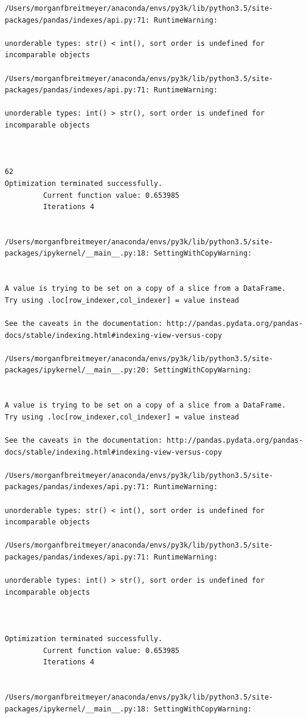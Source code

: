 \begin{lstlisting}
/Users/morganfbreitmeyer/anaconda/envs/py3k/lib/python3.5/site-packages/pandas/indexes/api.py:71: RuntimeWarning:

unorderable types: str() < int(), sort order is undefined for incomparable objects

/Users/morganfbreitmeyer/anaconda/envs/py3k/lib/python3.5/site-packages/pandas/indexes/api.py:71: RuntimeWarning:

unorderable types: int() > str(), sort order is undefined for incomparable objects



62
Optimization terminated successfully.
         Current function value: 0.653985
         Iterations 4


/Users/morganfbreitmeyer/anaconda/envs/py3k/lib/python3.5/site-packages/ipykernel/__main__.py:18: SettingWithCopyWarning:


A value is trying to be set on a copy of a slice from a DataFrame.
Try using .loc[row_indexer,col_indexer] = value instead

See the caveats in the documentation: http://pandas.pydata.org/pandas-docs/stable/indexing.html#indexing-view-versus-copy

/Users/morganfbreitmeyer/anaconda/envs/py3k/lib/python3.5/site-packages/ipykernel/__main__.py:20: SettingWithCopyWarning:


A value is trying to be set on a copy of a slice from a DataFrame.
Try using .loc[row_indexer,col_indexer] = value instead

See the caveats in the documentation: http://pandas.pydata.org/pandas-docs/stable/indexing.html#indexing-view-versus-copy

/Users/morganfbreitmeyer/anaconda/envs/py3k/lib/python3.5/site-packages/pandas/indexes/api.py:71: RuntimeWarning:

unorderable types: str() < int(), sort order is undefined for incomparable objects

/Users/morganfbreitmeyer/anaconda/envs/py3k/lib/python3.5/site-packages/pandas/indexes/api.py:71: RuntimeWarning:

unorderable types: int() > str(), sort order is undefined for incomparable objects



Optimization terminated successfully.
         Current function value: 0.653985
         Iterations 4


/Users/morganfbreitmeyer/anaconda/envs/py3k/lib/python3.5/site-packages/ipykernel/__main__.py:18: SettingWithCopyWarning:



\end{lstlisting}
